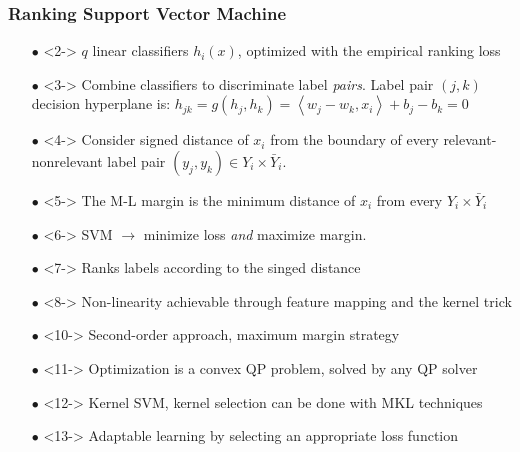\documentclass{beamer}
\begin{document}
\begin{frame}
\frametitle{Ranking Support Vector Machine}
\begin{itemize}
	\item[$\bullet$] <2-> $q$ linear classifiers $h_i(x)$, optimized with the empirical ranking loss
	\item[$\bullet$] <3-> Combine classifiers to discriminate label \emph{pairs}. Label pair $(j, k)$ decision hyperplane is: $h_{jk} = g(h_j, h_k) = \left<w_j-w_k, x_i \right> + b_j - b_k=0$
\item[$\bullet$] <4-> Consider signed distance of $x_i$ from the boundary of every
  relevant-nonrelevant label pair $(y_j,y_k) \in Y_i \times \bar Y_i$.
\item[$\bullet$] <5-> The M-L margin is the minimum distance of $x_i$ from every  $Y_i \times \bar Y_i$
\item[$\bullet$] <6-> SVM $\rightarrow$ minimize loss \emph{and} maximize margin.

\item[$\bullet$] <7-> Ranks labels according to the singed distance
\item[$\bullet$] <8-> Non-linearity achievable through feature mapping and the kernel trick
\end{itemize}
\begin{itemize}
\item[$\bullet$] <10-> Second-order approach, maximum margin strategy
\item[$\bullet$] <11-> Optimization is a convex QP problem, solved by any QP solver
\item[$\bullet$] <12-> Kernel SVM, kernel selection can be done with MKL techniques
\item[$\bullet$] <13-> Adaptable learning by selecting an appropriate loss function
\end{itemize}

\end{frame}
\end{document}
